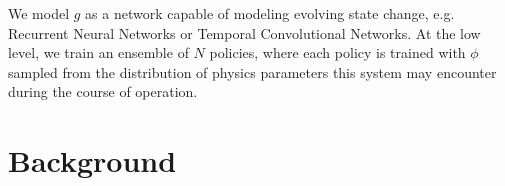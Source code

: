 \documentclass{article}
\begin{document}
We model $g$ as a network capable of modeling evolving state change, e.g. Recurrent Neural Networks or Temporal Convolutional Networks. At the low level, we train an ensemble of $N$ policies, where each policy is trained with $\phi$ sampled from the distribution of physics parameters this system may encounter during the course of operation.

\section{Background}



\end{document}
